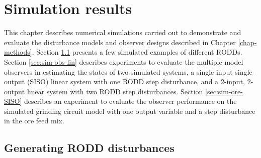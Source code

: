 \chapter{Simulation results}  \label{chap-simulation}
%
This chapter describes numerical simulations carried out to demonstrate and evaluate the disturbance models and observer designs described in Chapter \ref{chap-methods}. Section \ref{sec:sim-RODDs} presents a few simulated examples of different \gls{RODD}s. Section \ref{sec:sim-obs-lin} describes experiments to evaluate the multiple-model observers in estimating the states of two simulated systems, a single-input single-output (\gls{SISO}) linear system with one \gls{RODD} step disturbance, and a 2-input, 2-output linear system with two \gls{RODD} step disturbances. Section \ref{sec:sim-ore-SISO} describes an experiment to evaluate the observer performance on the simulated grinding circuit model with one output variable and a step disturbance in the ore feed mix. %


\section{Generating RODD disturbances} \label{sec:sim-RODDs}

